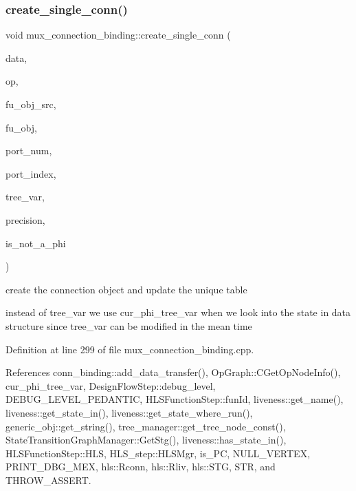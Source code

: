 \subsubsection{\texorpdfstring{create\+\_\+single\+\_\+conn()}{create\_single\_conn()}}
{\footnotesize\ttfamily void mux\+\_\+connection\+\_\+binding\+::create\+\_\+single\+\_\+conn (\begin{DoxyParamCaption}\item[{const \hyperlink{op__graph_8hpp_a9a0b240622c47584bee6951a6f5de746}{Op\+Graph\+Const\+Ref}}]{data,  }\item[{const \hyperlink{graph_8hpp_abefdcf0544e601805af44eca032cca14}{vertex} \&}]{op,  }\item[{\hyperlink{generic__obj_8hpp_acb533b2ef8e0fe72e09a04d20904ca81}{generic\+\_\+obj\+Ref}}]{fu\+\_\+obj\+\_\+src,  }\item[{\hyperlink{generic__obj_8hpp_acb533b2ef8e0fe72e09a04d20904ca81}{generic\+\_\+obj\+Ref}}]{fu\+\_\+obj,  }\item[{unsigned int}]{port\+\_\+num,  }\item[{unsigned int}]{port\+\_\+index,  }\item[{unsigned int}]{tree\+\_\+var,  }\item[{unsigned int}]{precision,  }\item[{const bool}]{is\+\_\+not\+\_\+a\+\_\+phi }\end{DoxyParamCaption})\hspace{0.3cm}{\ttfamily [private]}}



create the connection object and update the unique table 

instead of tree\+\_\+var we use cur\+\_\+phi\+\_\+tree\+\_\+var when we look into the state in data structure since tree\+\_\+var can be modified in the mean time 

Definition at line 299 of file mux\+\_\+connection\+\_\+binding.\+cpp.



References conn\+\_\+binding\+::add\+\_\+data\+\_\+transfer(), Op\+Graph\+::\+C\+Get\+Op\+Node\+Info(), cur\+\_\+phi\+\_\+tree\+\_\+var, Design\+Flow\+Step\+::debug\+\_\+level, D\+E\+B\+U\+G\+\_\+\+L\+E\+V\+E\+L\+\_\+\+P\+E\+D\+A\+N\+T\+IC, H\+L\+S\+Function\+Step\+::fun\+Id, liveness\+::get\+\_\+name(), liveness\+::get\+\_\+state\+\_\+in(), liveness\+::get\+\_\+state\+\_\+where\+\_\+run(), generic\+\_\+obj\+::get\+\_\+string(), tree\+\_\+manager\+::get\+\_\+tree\+\_\+node\+\_\+const(), State\+Transition\+Graph\+Manager\+::\+Get\+Stg(), liveness\+::has\+\_\+state\+\_\+in(), H\+L\+S\+Function\+Step\+::\+H\+LS, H\+L\+S\+\_\+step\+::\+H\+L\+S\+Mgr, is\+\_\+\+PC, N\+U\+L\+L\+\_\+\+V\+E\+R\+T\+EX, P\+R\+I\+N\+T\+\_\+\+D\+B\+G\+\_\+\+M\+EX, hls\+::\+Rconn, hls\+::\+Rliv, hls\+::\+S\+TG, S\+TR, and T\+H\+R\+O\+W\+\_\+\+A\+S\+S\+E\+RT.



